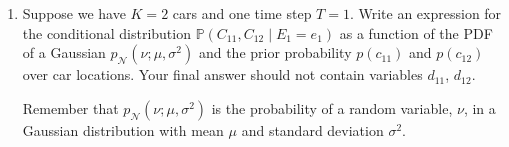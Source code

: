 \documentclass[10pt]{article}
\begin{document}
\begin{enumerate}[label=(\alph*)]

  \item Suppose we have $K = 2$ cars and one time step $T = 1$. Write an expression for the conditional distribution $\mathbb{P}(C_{11}, C_{12} \mid E_1 = e_1)$ as a function of the PDF of a Gaussian $p_{\mathcal{N}}(\nu; \mu, \sigma^2)$ and the prior probability $p(c_{11})$ and $p(c_{12})$ over car locations. Your final answer should not contain variables $d_{11}$, $d_{12}$.
  
  Remember that $p_{\mathcal{N}}(\nu; \mu, \sigma^2)$ is the probability of a random variable, $\nu$, in a Gaussian distribution with mean $\mu$ and standard deviation $\sigma^2$. 
  
  \begin{center}
	\end{center}
	

\end{enumerate}
\end{document}
